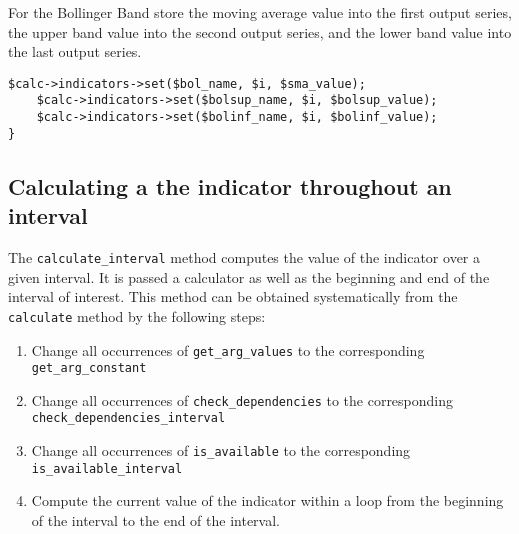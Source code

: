 \documentclass[11pt,twoside]{article}
\begin{document}
For the Bollinger Band store the moving average value into the first
output series, the upper band value into the second output series, and
the lower band value into the last output series.

\begin{lstlisting}[name=example]
    $calc->indicators->set($bol_name, $i, $sma_value);
    $calc->indicators->set($bolsup_name, $i, $bolsup_value);
    $calc->indicators->set($bolinf_name, $i, $bolinf_value);
}

\end{lstlisting}

\subsection[Calculating a the indicator throughout an
interval]{\label{bkm:Ref192603010}Calculating a the indicator
throughout an interval}
The \lstinline!calculate_interval! method computes the value of
the indicator over a given interval. It is passed a calculator as well
as the beginning and end of the interval of interest. This method can
be obtained systematically from the \lstinline!calculate!
method by the following steps:

\begin{enumerate}
\item Change all occurrences of \lstinline!get_arg_values! to the
corresponding \lstinline!get_arg_constant!
\item Change all occurrences of \lstinline!check_dependencies! to
the corresponding \lstinline!check_dependencies_interval!
\item Change all occurrences of \lstinline!is_available! to the
corresponding \lstinline!is_available_interval!
\item Compute the current value of the indicator within a loop from the
beginning of the interval to the end of the interval.
\end{enumerate}
\end{document}
